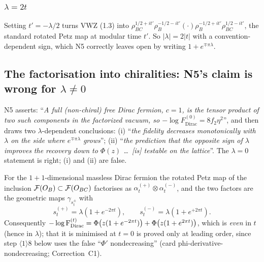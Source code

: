\documentclass[11pt]{article}
\begin{document}
\subsubsection*{$\lambda=2t$}
Setting $t'=-\lambda/2$ turns VWZ (1.3) into
$\rho_{BC}^{1/2+it'}\rho_B^{-1/2-it'}(\cdot)\rho_B^{-1/2+it'}\rho_{BC}^{1/2-it'}$, the standard
rotated Petz map at modular time $t'$.  So $|\lambda|=2|t|$ with a convention-dependent sign,
which N5 correctly leaves open by writing $1+e^{\mp\pi\lambda}$.  \checkmark

\subsection{The factorisation into chiralities: N5's claim is wrong for $\lambda\neq0$}
\label{sec:chirality}

N5 asserts: ``\emph{A full (non-chiral) free Dirac fermion, $c=1$, is the tensor product of two
such components in the factorized vacuum, so $-\log F^{(0)}_{\mathrm{Dirac}}=8f_2\eta^2$}'', and
then draws two $\lambda$-dependent conclusions: (i) ``\emph{the fidelity decreases monotonically
with $\lambda$ on the side where $e^{\mp\pi\lambda}$ grows}''; (ii) ``\emph{the prediction that the
opposite sign of $\lambda$ improves the recovery down to $\Phi(z)$ \dots\ [is] testable on the
lattice}''.  The $\lambda=0$ statement is right; (i) and (ii) are false.

\begin{proposition}\label{prop:chirality}
For the $1{+}1$-dimensional massless Dirac fermion the rotated Petz map of the inclusion
$\mathcal F(O_B)\subset\mathcal F(O_{BC})$ factorises as $\alpha_t^{(+)}\otimes\alpha_t^{(-)}$, and the two
factors are the geometric maps $\gamma_{s_t^{\pm}}$ with
\[
 s_t^{(+)}=\lambda(1+e^{-2\pi t}),\qquad s_t^{(-)}=\lambda(1+e^{+2\pi t}).
\]
Consequently
$-\log \operatorname{F}^{(t)}_{\mathrm{Dirac}}=\Phi\bigl(z(1+e^{-2\pi t})\bigr)+\Phi\bigl(z(1+e^{2\pi t})\bigr)$,
which is \emph{even} in $t$ (hence in $\lambda$); that it is minimised at $t=0$ is proved only at leading order, since step $\langle1\rangle8$ below uses the false ``$\Phi'$ nondecreasing'' (card phi-derivative-nondecreasing; Correction~C1).
\end{proposition}
\end{document}

